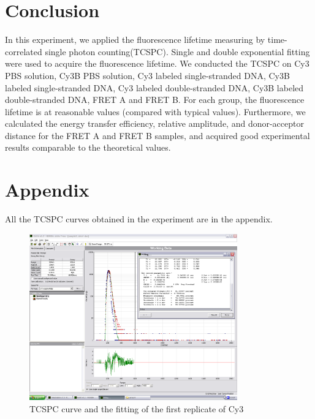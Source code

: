 \documentclass[a4paper,english,12pt,bibliography=totoc]{scrreprt}
\begin{document}
\chapter{Conclusion}
\label{cha:Conclusion}
In this experiment, we applied the fluorescence lifetime measuring by time-correlated single photon counting(TCSPC). Single and double exponential fitting were used to acquire the fluorescence lifetime. We conducted the TCSPC on Cy3 PBS solution, Cy3B PBS solution, Cy3 labeled single-stranded DNA, Cy3B labeled single-stranded DNA, Cy3 labeled double-stranded DNA, Cy3B labeled double-stranded DNA, FRET A and FRET B. For each group, the fluorescence lifetime is at reasonable values (compared with typical values). Furthermore, we calculated the energy transfer efficiency, relative amplitude, and donor-acceptor distance for the FRET A and FRET B samples, and acquired good experimental results comparable to the theoretical values.

\chapter{Appendix}
\label{cha:Appendix}

All the TCSPC curves obtained in the experiment are in the appendix.
\begin{figure}
    \centering
    \includegraphics[width=0.8\textwidth]{images/dyes/Cy3_data1_fit1.png}
    \caption{TCSPC curve and the fitting of the first replicate of Cy3}
    \label{Cy3_data1_fit1}
\end{figure}
\end{document}
